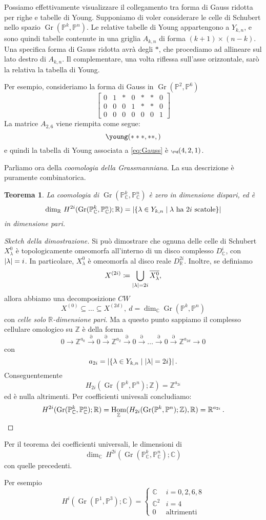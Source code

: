 \documentclass[a4paper, 11pt]{article}
\theoremstyle{definition}
\theoremstyle{plain}
\newtheorem{Teo}[Def]{Teorema}
\DeclarePairedDelimiter{\abs}{\lvert}{\rvert}
\newcommand{\PP}{\mathbb{P}}
\newcommand{\R}{\mathbb{R}}
\newcommand{\C}{\mathbb{C}}
\newcommand{\Z}{\mathbb{Z}}
\newcommand{\deff}{\coloneqq}
\DeclareMathOperator{\Hom}{Hom}
\DeclareMathOperator{\Gr}{Gr}
\begin{document}
Possiamo effettivamente visualizzare il collegamento tra forma di Gauss ridotta per righe e tabelle di Young. Supponiamo di voler considerare le celle di Schubert nello spazio $\Gr(\PP^k, \PP^n)$. Le relative tabelle di Young appartengono a $Y_{k,n}$, e sono quindi tabelle contenute in una griglia $A_{k,n}$ di forma $(k+1)\times (n-k)$. Una specifica forma di Gauss ridotta avrà degli $*$, che procediamo ad allineare sul lato destro di $A_{k,n}$. Il complementare, una volta riflessa sull'asse orizzontale, sarò la relativa la tabella di Young. 

Per esempio, consideriamo la forma di Gauss in $\Gr(\PP^2, \PP^6)$
\[
	\begin{bmatrix}
		0 & 1 & * & 0 & * & * & 0 \\
		0 & 0 & 0 & 1 & * & * & 0 \\
		0 & 0 & 0 & 0 & 0 & 0 & 1
	\end{bmatrix}	
\]
La matrice $A_{2,6}$ viene riempita come segue:
\begin{equation}\label{eq:Gauss}
	\young(\hfil ***,\hfil\hfil **,\hfil\hfil\hfil\hfil)
\end{equation}
e quindi la tabella di Young associata a \eqref{eq:Gauss} è $\tiny \yng(4,2,1)$.\vspace{1ex}

Parliamo ora della \emph{coomologia della Grassmanniana}. La sua descrizione è puramente combinatorica.
\begin{Teo}
	La coomologia di $\Gr(\PP^k_\C, \PP^n_\C)$ è zero in dimensione dispari, ed è
	\[
		\dim_\R\,H^{2i}(\Gr(\PP^k_\C, \PP^n_\C); \R) = \abs{\{\lambda \in Y_{k,n}\mid \lambda \text{ ha $2i$ scatole}\}}
	\]
	in dimensione pari.
\end{Teo}
\begin{proof}[Sketch della dimostrazione]
	Si può dimostrare che ognuna delle celle di Schubert $X^0_\lambda$ è topologicamente omeomorfa all'interno di un disco complesso $D_\C^i$, con $\abs{\lambda} = i$. In particolare, $X^0_\lambda$ è omeomorfa al disco reale $D_\R^{2i}$. Inoltre, se definiamo
	\[
		X^{(2i)} \deff \bigcup_{\abs{\lambda} = 2i} \overline{X^0_\lambda},
	\]
	allora abbiamo una decomposizione $CW$
	\[	
		X^{(0)} \subseteq \dots \subseteq X^{(2d)},\ d = \dim_\C \Gr(\PP^k, \PP^n)
	\]
	con \emph{celle solo $\R$-dimensione pari}. Ma a questo punto sappiamo il complesso cellulare omologico su $\Z$ è della forma
	\[
		0 \to \Z^{a_0} \overset{\partial}{\to} 0 \overset{\partial}{\to} \Z^{a_2} \overset{\partial}{\to} 0 \overset{\partial}{\to} \dots \overset{\partial}{\to} 0 \overset{\partial}{\to} \Z^{a_{2d}} \to 0 
	\]
	con 
	\[
		a_{2i} = \abs{\{\lambda \in Y_{k,n} \mid \abs{\lambda} = 2i\}}\,.
	\]
	Conseguentemente 
	\[
		H_{2i}(\Gr(\PP^k, \PP^n);\Z) = \Z^{a_{2i}}
	\]
	ed è nulla altrimenti. Per coefficienti univesali concludiamo:
	\[
		H^{2i}(\Gr(\PP^k_\C, \PP^n_\C); \R) = \Hom_\Z(H_{2i}(\Gr(\PP^k, \PP^n);\Z),\R) = \R^{a_{2i}}\,. \qedhere
	\]
\end{proof}
Per il teorema dei coefficienti universali, le dimensioni di 
\[
	\dim_\C\,H^{2i}(\Gr(\PP^k_\C, \PP^n_\C); \C)
\]
con quelle precedenti.

Per esempio
\[
	H^i(\Gr(\PP^1, \PP^3);\C) = 
	\begin{cases}
		\C & i = 0,2,6,8\\
		\C^2 & i = 4\\
		0 &\text{altrimenti}
	\end{cases}
\]
\end{document}
